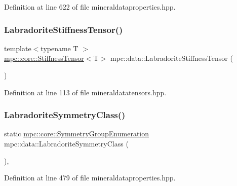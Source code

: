 Definition at line 622 of file mineraldataproperties.\+hpp.

\mbox{\label{namespacempc_1_1data_a9acb3c22bd40c477d5a2f9937066a9bd}} 
\subsubsection{\texorpdfstring{Labradorite\+Stiffness\+Tensor()}{LabradoriteStiffnessTensor()}}
{\footnotesize\ttfamily template$<$typename T $>$ \\
\mbox{\hyperlink{structmpc_1_1core_1_1_stiffness_tensor}{mpc\+::core\+::\+Stiffness\+Tensor}}$<$T$>$ mpc\+::data\+::\+Labradorite\+Stiffness\+Tensor (\begin{DoxyParamCaption}{ }\end{DoxyParamCaption})}



Definition at line 113 of file mineraldatatensors.\+hpp.

\mbox{\label{namespacempc_1_1data_abff1c2d49cd8cedd4cd296fac8e54a7b}} 
\subsubsection{\texorpdfstring{Labradorite\+Symmetry\+Class()}{LabradoriteSymmetryClass()}}
{\footnotesize\ttfamily static \mbox{\hyperlink{namespacempc_1_1core_a9d979684062547055a0ef5c13077bad8}{mpc\+::core\+::\+Symmetry\+Group\+Enumeration}} mpc\+::data\+::\+Labradorite\+Symmetry\+Class (\begin{DoxyParamCaption}{ }\end{DoxyParamCaption})\hspace{0.3cm}{\ttfamily [inline]}, {\ttfamily [static]}}



Definition at line 479 of file mineraldataproperties.\+hpp.

\mbox{\label{namespacempc_1_1data_a168099e03b574ce4a024d47e839c2e0c}} 
